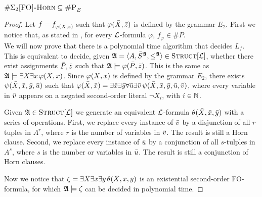 \begin{theo}
	$\#\Sigma_2\textsc{[FO]-Horn} \subseteq \textsc{\#P}_E$
\end{theo} 
\begin{proof}
	Let $f = f_{\varphi(\bar{X},\bar{z})}$ such that $\varphi(\bar{X},\bar{z})$ is defined by the grammar $E_2$. First we notice that, as stated in \cite{DBLP:journals/jcss/SalujaST95}, for every ${\cal L}$-formula $\varphi$, $f_{\varphi}\in\#P$.\\
	
	We will now prove that there is a polynomial time algorithm that decides $L_{f}$. This is equivalent to decide, given ${\frak A}= \langle A, \bar{S}^{\frak A}, \leq^{\frak A} \rangle\in\textsc{Struct}[{\cal L}]$, whether there exist assignments $\bar{P},\bar{z}$ such that ${\frak A}\models\varphi(\bar{P},\bar{z})$. This is the same as ${\frak A}\models\exists\bar{X}\exists\bar{x}\,\varphi(\bar{X},\bar{x})$. Since $\varphi(\bar{X},\bar{x})$ is defined by the grammar $E_2$, there exists $\psi(\bar{X},\bar{x},\bar{y},\bar{u})$ such that $\varphi(\bar{X},\bar{x}) = \exists\bar{x}\exists\bar{y}\forall\bar{u}\exists\bar{v}\,\psi(\bar{X},\bar{x},\bar{y},\bar{u},\bar{v})$, where every variable in $\bar{v}$ appears on a negated second-order literal $\neg X_i$, with $i\in\mathbb{N}$.
	
	Given ${\frak A}\in\textsc{Struct}[{\cal L}]$ we generate an equivalent ${\cal L}$-formula $\theta(\bar{X},\bar{x},\bar{y})$ with a series of operations. First, we replace every instance of $\bar{v}$ by a disjunction of all $r$-tuples in $A^r$, where $r$ is the number of variables in $\bar{v}$. The result is still a Horn clause. Second, we replace every instance of $\bar{u}$ by a conjunction of all $s$-tulples in $A^s$, where $s$ is the number or variables in $\bar{u}$. The result is still a conjunction of Horn clauses.
	
	Now we notice that $\zeta = \exists\bar{X}\exists\bar{x}\exists\bar{y}\,\theta(\bar{X},\bar{x},\bar{y})$ is an existential second-order FO-formula, for which ${\frak A}\models\zeta$ can be decided in polynomial time.
\end{proof}